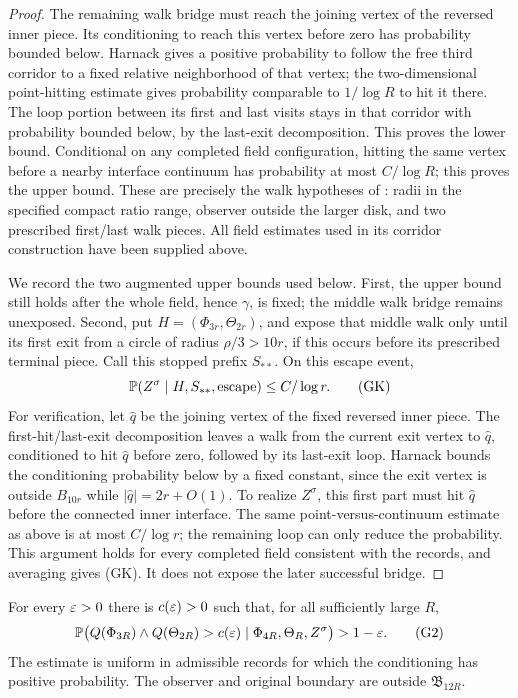 \begin{proof}
The remaining walk bridge must reach the joining vertex of the reversed
inner piece. Its conditioning to reach this vertex before zero has
probability bounded below. Harnack gives a positive probability to
follow the free third corridor to a fixed relative neighborhood of
that vertex; the two-dimensional point-hitting estimate gives
probability comparable to \(1/\log R\) to hit it there. The loop portion
between its first and last visits stays in that corridor with probability
bounded below, by the last-exit decomposition. This proves the lower
bound. Conditional on any completed field configuration, hitting the
same vertex before a nearby interface continuum has probability at
most \(C/\log R\); this proves the upper bound. These are precisely
the walk hypotheses of \cite[Lemma 3.14]{SSdiscrete}: radii in the
specified compact ratio range, observer outside the larger disk,
and two prescribed first/last walk pieces. All field estimates used
in its corridor construction have been supplied above.

We record the two augmented upper bounds used below. First, the upper
bound still holds after the whole field, hence \(\gamma\), is fixed;
the middle walk bridge remains unexposed. Second, put
\(H=(\Phi_{3r},\Theta_{2r})\), and expose that middle walk only until
its first exit from a circle of radius \(\rho/3>10r\), if this occurs
before its prescribed terminal piece. Call this stopped prefix
\(S_{**}\). On this escape event,
\[
 \mathbb P(Z^\sigma\mid H,S_{**},\hbox{escape})
       \leq C/\log r.                              \tag{GK}
\]
For verification, let \(\hat q\) be the joining vertex of the fixed
reversed inner piece. The first-hit/last-exit decomposition leaves a
walk from the current exit vertex to \(\hat q\), conditioned to hit
\(\hat q\) before zero, followed by its last-exit loop. Harnack bounds
the conditioning probability below by a fixed constant, since the
exit vertex is outside \(B_{10r}\) while
\(|\hat q|=2r+O(1)\). To realize \(Z^\sigma\), this first part
must hit \(\hat q\) before the connected inner interface. The same
point-versus-continuum estimate as above is at most \(C/\log r\);
the remaining loop can only reduce the probability. This argument
holds for every completed field consistent with the records, and
averaging gives (GK). It does not expose the later successful bridge.
\end{proof}

\begin{lemma}\label{g:separation}
For every \(\varepsilon>0\) there is \(c(\varepsilon)>0\) such that, for all
sufficiently large \(R\),
\[
 \mathbb P\bigl(Q(\Phi_{3R})\wedge Q(\Theta_{2R})>c(\varepsilon)
       \mid\Phi_{4R},\Theta_R,Z^\sigma\bigr)>1-\varepsilon .       \tag{G2}
\]
The estimate is uniform in admissible records for which the conditioning
has positive probability.  The observer and original boundary are outside
\(\mathfrak B_{12R}\).
\end{lemma}

